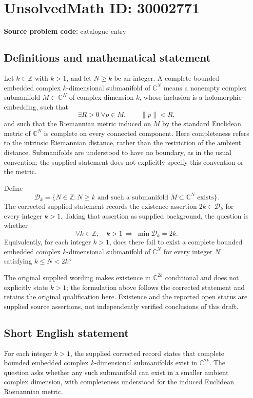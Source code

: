 \documentclass[11pt]{article}
\newcommand{\Z}{\mathbb{Z}}
\newcommand{\C}{\mathbb{C}}
\begin{document}
\section*{UnsolvedMath ID: 30002771}
\textbf{Source problem code:} catalogue entry
\subsection{Definitions and mathematical statement}
Let \(k\in\Z\) with \(k>1\), and let \(N\geq k\) be an integer. A complete bounded embedded complex \(k\)-dimensional submanifold of \(\C^N\) means a nonempty complex submanifold \(M\subset\C^N\) of complex dimension \(k\), whose inclusion is a holomorphic embedding, such that
\[
\exists R>0\ \forall p\in M,\qquad \|p\|<R,
\]
and such that the Riemannian metric induced on \(M\) by the standard Euclidean metric of \(\C^N\) is complete on every connected component. Here completeness refers to the intrinsic Riemannian distance, rather than the restriction of the ambient distance. Submanifolds are understood to have no boundary, as in the usual convention; the supplied statement does not explicitly specify this convention or the metric.

Define
\[
\mathcal D_k=\{N\in\Z:N\geq k\text{ and such a submanifold }M\subset\C^N\text{ exists}\}.
\]
The corrected supplied statement records the existence assertion \(2k\in\mathcal D_k\) for every integer \(k>1\). Taking that assertion as supplied background, the question is whether
\[
\forall k\in\Z,\quad k>1\ \Longrightarrow\ \min\mathcal D_k=2k.
\]
Equivalently, for each integer \(k>1\), does there fail to exist a complete bounded embedded complex \(k\)-dimensional submanifold of \(\C^N\) for every integer \(N\) satisfying \(k\leq N<2k\)?

The original supplied wording makes existence in \(\C^{2k}\) conditional and does not explicitly state \(k>1\); the formulation above follows the corrected statement and retains the original qualification here. Existence and the reported open status are supplied source assertions, not independently verified conclusions of this draft.
\subsection{Short English statement}
For each integer \(k>1\), the supplied corrected record states that complete bounded embedded complex \(k\)-dimensional submanifolds exist in \(\C^{2k}\). The question asks whether any such submanifold can exist in a smaller ambient complex dimension, with completeness understood for the induced Euclidean Riemannian metric.
\end{document}
